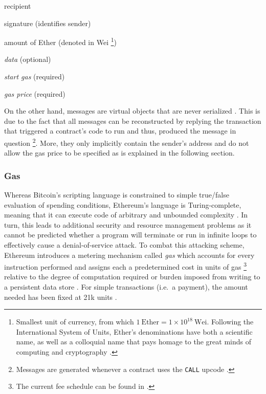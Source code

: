 \begin{AutoMultiColItemize}
  \item recipient
  \item signature (identifies sender)
  \item amount of Ether (denoted in Wei \footnote{Smallest unit of currency, from which $1\ \text{Ether} = 1 \times 10^{18}\ \text{Wei}$. Following the International System of Units, Ether's denominations have both a scientific name, as well as a colloquial name that pays homage to the great minds of computing and cryptography \cite[p.~40]{Antonopoulos.2018}.})
  \item \textit{data} (optional)
  \item \textit{start gas} (required)
  \item \textit{gas price} (required)
\end{AutoMultiColItemize}

On the other hand, messages are virtual objects that are never serialized \cite[p.~19]{ethereumWhitepaperGitHub}. This is due to the fact that all messages can be reconstructed by replying the transaction that triggered a contract's code to run and thus, produced the message in question \footnote{Messages are generated whenever a contract uses the \texttt{CALL} upcode \cite[p.~19]{ethereumWhitepaperGitHub}.}. More, they only implicitly contain the sender's address and do not allow the gas price to be specified as is explained in the following section.

\subsubsection{Gas}
\label{sec:gas}
Whereas Bitcoin's scripting language is constrained to simple true/false evaluation of spending conditions, Ethereum's language is Turing-complete, meaning that it can execute code of arbitrary and unbounded complexity \cite[p.~25]{Antonopoulos.2018}. In turn, this leads to additional security and resource management problems as it cannot be predicted whether a program will terminate or run in infinite loops to effectively cause a denial-of-service attack. To combat this attacking scheme, Ethereum introduces a metering mechanism called \textit{gas} which accounts for every instruction performed and assigns each a predetermined cost in units of gas \footnote{The current fee schedule can be found in \cite[p.~25]{ethereumYellowPaper}.} relative to the degree of computation required or burden imposed from writing to a persistent data store \cite[pp.~32--33]{Antonopoulos.2018}. For simple transactions (i.e.~a payment), the amount needed has been fixed at 21k units \cite[p.~153]{Antonopoulos.2018}. 

